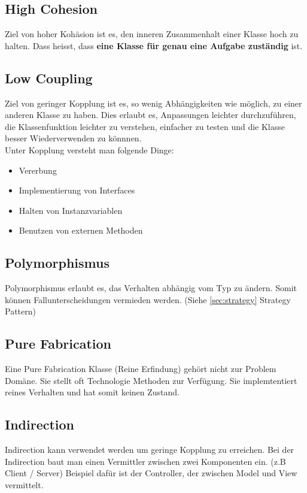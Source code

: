 \subsection{High Cohesion}
Ziel von hoher Kohäsion ist es, den inneren Zusammenhalt einer Klasse hoch zu halten. Dass heisst, dass \textbf{eine Klasse für genau eine Aufgabe zuständig} ist.

\subsection{Low Coupling}
Ziel von geringer Kopplung ist es, so wenig Abhängigkeiten wie möglich, zu einer anderen Klasse zu haben. Dies erlaubt es, Anpassungen leichter durchzuführen, die Klassenfunktion leichter zu verstehen, einfacher zu testen und die Klasse besser Wiederverwenden zu könnnen. \\

Unter Kopplung versteht man folgende Dinge:
\begin{itemize}
	\item Vererbung
	\item Implementierung von Interfaces
	\item Halten von Instanzvariablen
	\item Benutzen von externen Methoden
\end{itemize}

\subsection{Polymorphismus}
Polymorphismus erlaubt es, das Verhalten abhängig vom Typ zu ändern. Somit können Fallunterscheidungen vermieden werden. (Siehe \ref{sec:strategy} Strategy Pattern)

\subsection{Pure Fabrication}
Eine Pure Fabrication Klasse (Reine Erfindung) gehört nicht zur Problem Domäne. Sie stellt oft Technologie Methoden zur Verfügung. Sie implemtentiert reines Verhalten und hat somit keinen Zustand.

\subsection{Indirection}
Indirection kann verwendet werden um geringe Kopplung zu erreichen. Bei der Indirection baut man einen Vermittler zwischen zwei Komponenten ein. (z.B Client / Server) Beispiel dafür ist der Controller, der zwischen Model und View vermittelt.

